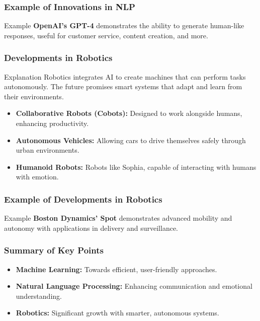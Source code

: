 \documentclass{beamer}
\begin{document}
\begin{frame}[fragile]
    \frametitle{Example of Innovations in NLP}
    \begin{block}{Example}
        \textbf{OpenAI's GPT-4} demonstrates the ability to generate human-like responses, useful for customer service, content creation, and more.
    \end{block}
\end{frame}

\begin{frame}[fragile]
    \frametitle{Developments in Robotics}
    \begin{block}{Explanation}
        Robotics integrates AI to create machines that can perform tasks autonomously. The future promises smart systems that adapt and learn from their environments.
    \end{block}
    \begin{itemize}
        \item \textbf{Collaborative Robots (Cobots):} Designed to work alongside humans, enhancing productivity.
        \item \textbf{Autonomous Vehicles:} Allowing cars to drive themselves safely through urban environments.
        \item \textbf{Humanoid Robots:} Robots like Sophia, capable of interacting with humans with emotion.
    \end{itemize}
\end{frame}

\begin{frame}[fragile]
    \frametitle{Example of Developments in Robotics}
    \begin{block}{Example}
        \textbf{Boston Dynamics' Spot} demonstrates advanced mobility and autonomy with applications in delivery and surveillance.
    \end{block}
\end{frame}

\begin{frame}[fragile]
    \frametitle{Summary of Key Points}
    \begin{itemize}
        \item \textbf{Machine Learning:} Towards efficient, user-friendly approaches.
        \item \textbf{Natural Language Processing:} Enhancing communication and emotional understanding.
        \item \textbf{Robotics:} Significant growth with smarter, autonomous systems.
    \end{itemize}
\end{frame}
\end{document}
